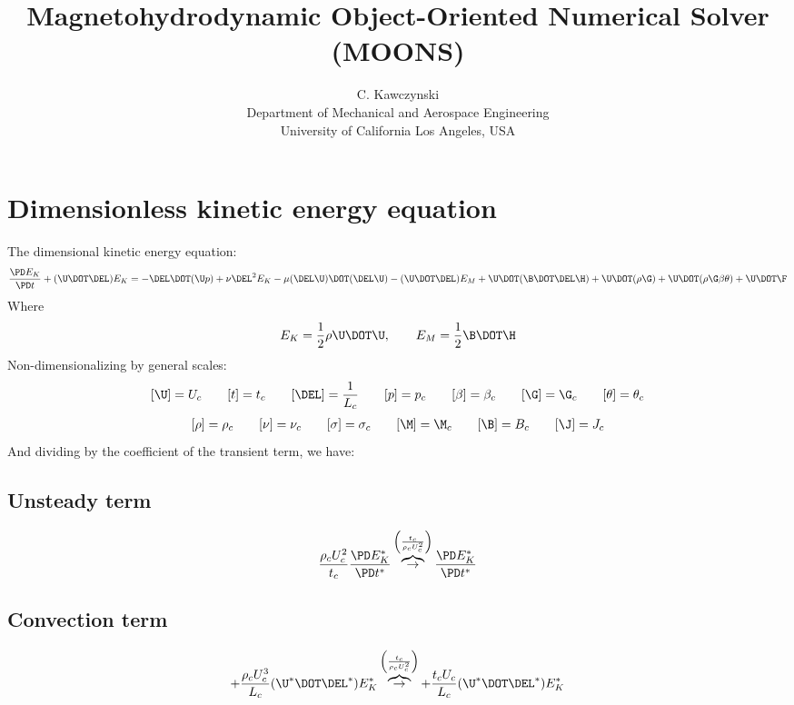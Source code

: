 \documentclass[11pt]{article}
\newcommand{\OB}{\overbrace{\rightarrow}^{\left(\frac{t_c}{\rho_c U_c^2}\right)}}
\begin{document}
\doublespacing
\title{Magnetohydrodynamic Object-Oriented Numerical Solver (MOONS)}
\author{C. Kawczynski \\
Department of Mechanical and Aerospace Engineering \\
University of California Los Angeles, USA\\
}
\maketitle

\section{Dimensionless kinetic energy equation}
The dimensional kinetic energy equation:
\begin{equation}
	\frac{\PD E_K}{\PD t}
	+ (\U \DOT \DEL) E_K
	= 
	- \DEL \DOT (\U p)
	+ \nu \DEL^2 E_K
	- \mu (\DEL \U) \DOT (\DEL \U)
	- (\U \DOT \DEL) E_M
	+ \U \DOT (\B \DOT \DEL \H)
	+ \U \DOT (\rho \G)
	+ \U \DOT (\rho \G \beta \theta)
	+ \U \DOT \F
\end{equation}
Where
\begin{equation}
	E_K = \frac{1}{2} \rho \U \DOT \U, \qquad
	E_M = \frac{1}{2} \B \DOT \H
\end{equation}
Non-dimensionalizing by general scales:
\begin{equation}\begin{aligned}
	[\U] = U_c \qquad
	[t] = t_c \qquad
	[\DEL] = \frac{1}{L_c} \qquad
	[p] = p_c \qquad
	[\beta] = \beta_c \qquad
	[\G] = \G_c \qquad
	[\theta] = \theta_c
\end{aligned}\end{equation}
\begin{equation}\begin{aligned}
	[\rho] = \rho_c \qquad
	[\nu] = \nu_c \qquad
	[\sigma] = \sigma_c \qquad
	[\M] = \M_c \qquad
	[\B] = B_c \qquad
	[\J] = J_c
\end{aligned}\end{equation}
And dividing by the coefficient of the transient term, we have:
\subsection{Unsteady term}
\begin{equation}
	\frac{\rho_c U_c^2}{t_c} \frac{\PD E_K^*}{\PD t^*}
	\OB
	\frac{\PD E_K^*}{\PD t^*}
\end{equation}
\subsection{Convection term}
\begin{equation}
	+ \frac{\rho_c U_c^3}{L_c} (\U^* \DOT \DEL^*) E_K^*
	\OB
	+ \frac{t_c U_c}{L_c} (\U^* \DOT \DEL^*) E_K^*
\end{equation}
\end{document}
